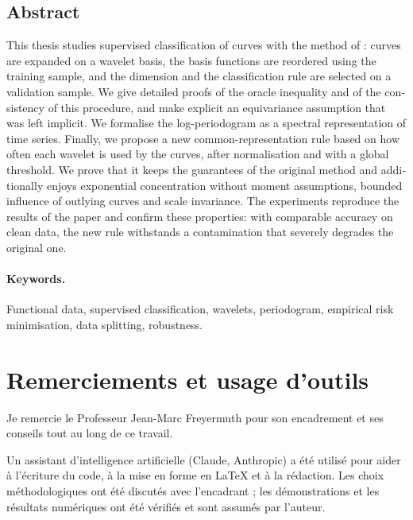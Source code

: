 \begin{otherlanguage}{english}
\section*{Abstract}

This thesis studies supervised classification of curves with the method of \citet{berlinet2008functional}: curves are expanded on a wavelet basis, the basis functions are reordered using the training sample, and the dimension and the classification rule are selected on a validation sample. We give detailed proofs of the oracle inequality and of the consistency of this procedure, and make explicit an equivariance assumption that was left implicit. We formalise the log-periodogram as a spectral representation of time series. Finally, we propose a new common-representation rule based on how often each wavelet is used by the curves, after normalisation and with a global threshold. We prove that it keeps the guarantees of the original method and additionally enjoys exponential concentration without moment assumptions, bounded influence of outlying curves and scale invariance. The experiments reproduce the results of the paper and confirm these properties: with comparable accuracy on clean data, the new rule withstands a contamination that severely degrades the original one.

\paragraph{Keywords.} Functional data, supervised classification, wavelets, periodogram, empirical risk minimisation, data splitting, robustness.
\end{otherlanguage}

\vspace{1cm}

\section*{Remerciements et usage d'outils}

Je remercie le Professeur Jean-Marc Freyermuth pour son encadrement et ses conseils tout au long de ce travail.

\noindent Un assistant d'intelligence artificielle (Claude, Anthropic) a été utilisé pour aider à l'écriture du code, à la mise en forme en \LaTeX{} et à la rédaction. Les choix méthodologiques ont été discutés avec l'encadrant ; les démonstrations et les résultats numériques ont été vérifiés et sont assumés par l'auteur.

